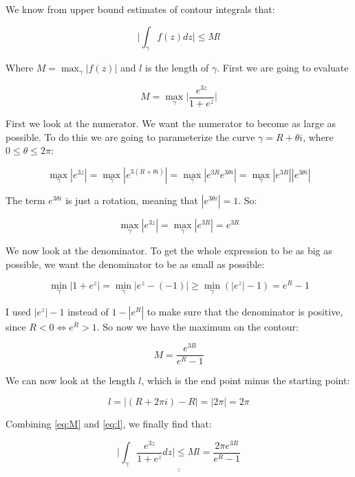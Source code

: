 \documentclass[a4paper,norsk, 10pt]{article}
\begin{document}
We know from upper bound estimates of contour integrals that:

$$
\bigg| \int_{\gamma} f(z) dz \bigg| \leq M l 
$$

Where $M = \max_{\gamma} |f(z)|$ and $l$ is the length of $\gamma$. First we are going to evaluate

$$
M = \max_{\gamma}\bigg|\frac{e^{3z}}{1+e^z}\bigg|
$$

First we look at the numerator. We want the numerator to become as large as possible. To do this we are going to parameterize the curve $\gamma = R + \theta i$, where $0\leq \theta \leq 2\pi$:

$$
\max_ {\gamma} |e^{3z}| = \max_ {\gamma} |e^{3(R + \theta i)}| = \max_ {\gamma} |e^{3R}e^{3\theta i}|=\max_ {\gamma} |e^{3R}||e^{3\theta i}|
$$

The term $e^{3\theta i}$ is just a rotation, meaning that $|e^{3\theta i}| = 1$. So:

\begin{equation}
\max_ {\gamma} |e^{3z}| = \max_ {\gamma} |e^{3R}| = e^{3R}
\label{eq:maxNum}
\end{equation}

We now look at the denominator. To get the whole expression to be as big as possible, we want the denominator to be as small as possible:

$$
\min_{\gamma} |1+ e^z| = \min_{\gamma}|e^z - (-1)| \geq \min_{\gamma}(|e^z| - 1) = e^R -1
$$

I used $|e^z| - 1$ instead of $1-|e^R|$ to make sure that the denominator is positive, since $R<0 \Leftrightarrow e^R > 1$. So now we have the maximum on the contour:

\begin{equation}
M = \frac{e^{3R}}{e^R - 1}
\label{eq:M}
\end{equation}

We can now look at the length $l$, which is the end point minus the starting point:

\begin{equation}
l = |(R + 2\pi i) - R | = |2\pi| = 2\pi
\label{eq:l}
\end{equation}

Combining \ref{eq:M} and \ref{eq:l}, we finally find that:

$$
\underline{\underline{\bigg| \int_{\gamma} \frac{e^{3z}}{1+e^z} dz \bigg| \leq M l = \frac{2\pi e^{3R}}{e^R-1}}}
$$
\end{document}
